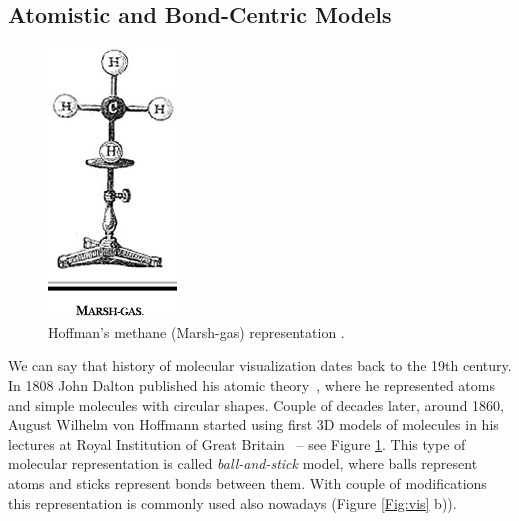 \subsection{Atomistic and Bond-Centric Models}
\begin{figure} 
\vspace{-65pt}
  \begin{center}
  \includegraphics[width=0.65\linewidth]{pictures/04_hoffman.jpg} 
  \caption{Hoffman's methane (Marsh-gas) representation \cite{perkins2005history}.}
  \label{Fig:hoffman}  
\end{center}
  \vspace{-30pt}
\end{figure}

We can say that history of molecular visualization dates back to the 19th century. In 1808 John Dalton published his atomic theory~\cite{dalton1808new}, where he represented atoms and simple molecules with circular shapes. Couple of decades later, around 1860, August Wilhelm von Hoffmann started using first 3D models of molecules in his lectures at Royal Institution of Great Britain~\cite{perkins2005history} -- see Figure \ref{Fig:hoffman}. This type of molecular representation is called \textit{ball-and-stick} model, where balls represent atoms and sticks represent bonds between them. With couple of modifications this representation is commonly used also nowadays (Figure \ref{Fig:vis} b)). 

